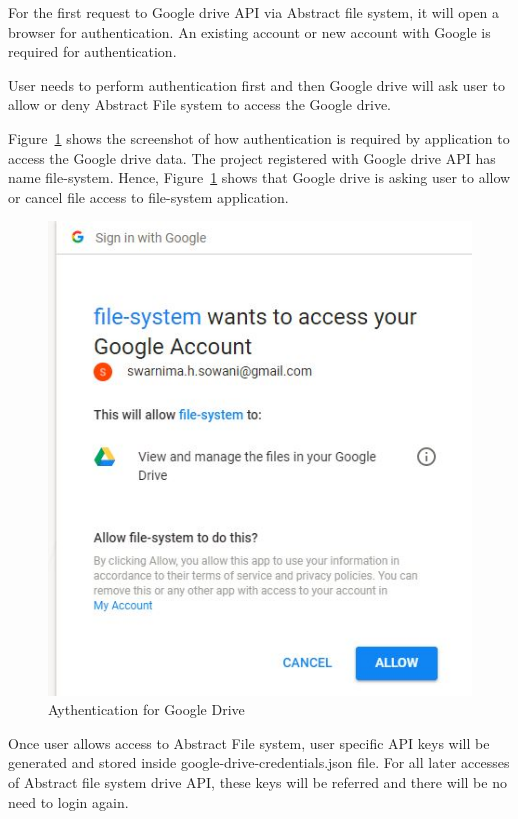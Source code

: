 For the first request to Google drive API via Abstract file system, it
will open a browser for authentication. An existing account or new
account with Google is required for authentication.

User needs to perform authentication first and then Google drive will
ask user to allow or deny Abstract File system to access the Google
drive.

Figure~\ref{fig:auth} shows the screenshot of how authentication is 
required by application to access the Google drive data. 
The project registered with Google drive API has name file-system. 
Hence, Figure~\ref{fig:auth} shows that Google drive is asking user 
to allow or cancel file access to file-system application. 

\begin{figure}[!ht]
        \centering\includegraphics[width=\columnwidth]
        {image/auth.JPG}
        \caption{Aythentication for Google Drive}\label{fig:auth}
\end{figure}


Once user allows access to Abstract File system, user specific API
keys will be generated and stored inside google-drive-credentials.json
file.  For all later accesses of Abstract file system drive API, these
keys will be referred and there will be no need to login again.


